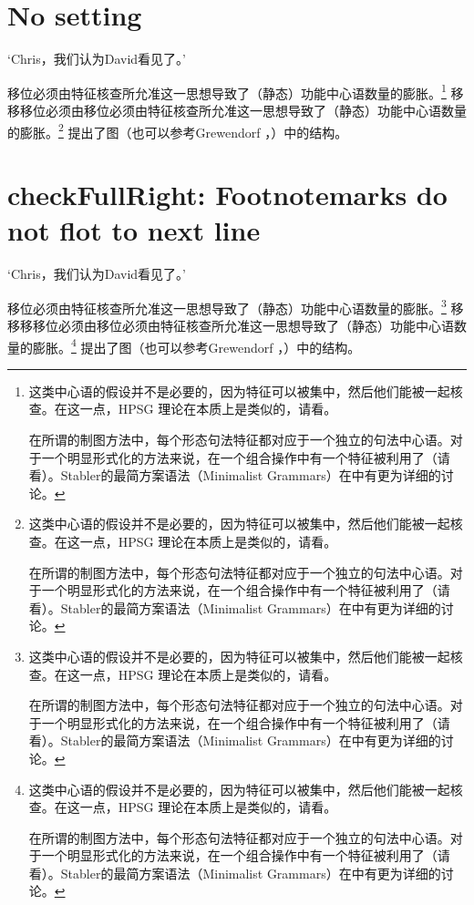 \documentclass{scrbook}
\let\citew\citealp
\newcommand{\page}{}
\begin{document}
\chapter{No setting}

    `Chris，我们认为David看见了。'

移位必须由特征核查所允准这一思想导致了（静态）功能中心语数量的膨胀。\footnote{%
这类中心语的假设并不是必要的，因为特征可以被集中，然后他们能被一起核查。在这一点，HPSG 理论在本质上是类似的，请看\citew[\S~II.3.3.4, \S~II.4.2]{Sternefeld2006a-u}。

在所谓的制图方法中，每个形态句法特征都对应于一个独立的句法中心语\citep[\page 54, 61]{CR2010a}。对于一个明显形式化的方法来说，在一个组合操作中有一个特征被利用了（请看\citew[\page 335]{Stabler2001a}）。Stabler的最简方案语法（Minimalist Grammars）在中有更为详细的讨论。
}
移移移位必须由移位必须由特征核查所允准这一思想导致了（静态）功能中心语数量的膨胀。\footnote{%
这类中心语的假设并不是必要的，因为特征可以被集中，然后他们能被一起核查。在这一点，HPSG 理论在本质上是类似的，请看\citew[\S~II.3.3.4, \S~II.4.2]{Sternefeld2006a-u}。

在所谓的制图方法中，每个形态句法特征都对应于一个独立的句法中心语\citep[\page 54, 61]{CR2010a}。对于一个明显形式化的方法来说，在一个组合操作中有一个特征被利用了（请看\citew[\page 335]{Stabler2001a}）。Stabler的最简方案语法（Minimalist Grammars）在中有更为详细的讨论。
}
\citet[\page 297]{Rizzi97a-u}提出了图（也可以参考Grewendorf \citeyear[\page 85, 240]{Grewendorf2002a}，\citeyear{Grewendorf2009a}）中的结构。

\chapter{checkFullRight: Footnotemarks do not flot to next line}


    `Chris，我们认为David看见了。'

移位必须由特征核查所允准这一思想导致了（静态）功能中心语数量的膨胀。\footnote{%
这类中心语的假设并不是必要的，因为特征可以被集中，然后他们能被一起核查。在这一点，HPSG 理论在本质上是类似的，请看\citew[\S~II.3.3.4, \S~II.4.2]{Sternefeld2006a-u}。

在所谓的制图方法中，每个形态句法特征都对应于一个独立的句法中心语\citep[\page 54, 61]{CR2010a}。对于一个明显形式化的方法来说，在一个组合操作中有一个特征被利用了（请看\citew[\page 335]{Stabler2001a}）。Stabler的最简方案语法（Minimalist Grammars）在中有更为详细的讨论。
}
移移移移位必须由移位必须由特征核查所允准这一思想导致了（静态）功能中心语数量的膨胀。\footnote{%
这类中心语的假设并不是必要的，因为特征可以被集中，然后他们能被一起核查。在这一点，HPSG 理论在本质上是类似的，请看\citew[\S~II.3.3.4, \S~II.4.2]{Sternefeld2006a-u}。

在所谓的制图方法中，每个形态句法特征都对应于一个独立的句法中心语\citep[\page 54, 61]{CR2010a}。对于一个明显形式化的方法来说，在一个组合操作中有一个特征被利用了（请看\citew[\page 335]{Stabler2001a}）。Stabler的最简方案语法（Minimalist Grammars）在中有更为详细的讨论。
}
\citet[\page 297]{Rizzi97a-u}提出了图（也可以参考Grewendorf \citeyear[\page 85, 240]{Grewendorf2002a}，\citeyear{Grewendorf2009a}）中的结构。
\end{document}
